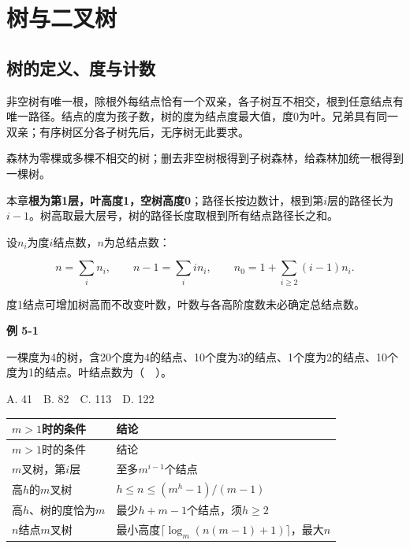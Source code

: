 \chapter{树与二叉树}\label{DS05}

\section{树的定义、度与计数}\label{DS05-tree}

非空树有唯一根，除根外每结点恰有一个双亲，各子树互不相交，根到任意结点有唯一路径。结点的度为孩子数，树的度为结点度最大值，度0为叶。兄弟具有同一双亲；有序树区分各子树先后，无序树无此要求。

森林为零棵或多棵不相交的树；删去非空树根得到子树森林，给森林加统一根得到一棵树。

本章\textbf{根为第1层，叶高度1，空树高度0}；路径长按边数计，根到第\(i\)层的路径长为\(i-1\)。树高取最大层号，树的路径长度取根到所有结点路径长之和。

设\(n_i\)为度\(i\)结点数，\(n\)为总结点数：

\[n=\sum_i n_i,\qquad n-1=\sum_i i n_i,\qquad n_0=1+\sum_{i\ge2}(i-1)n_i.\]

度1结点可增加树高而不改变叶数，叶数与各高阶度数未必确定总结点数。

\par\medskip{}\noindent\hypertarget{DS05-E01}{}\label{DS05-E01}\textbf{例 5-1}\par\nobreak\smallskip

一棵度为4的树，含20个度为4的结点、10个度为3的结点、1个度为2的结点、10个度为1的结点。叶结点数为（　）。

A. 41　B. 82　C. 113　D. 122

\par\smallskip
{\fontsize{9.3}{12}\selectfont\setlength{\tabcolsep}{2.5pt}\setlength{\LTleft}{0pt}\setlength{\LTright}{0pt}
\begin{longtable}{@{}>{\raggedright\arraybackslash}p{}>{\raggedright\arraybackslash}p{}@{}}
\toprule
\(m>1\)时的条件 & 结论 \\

\midrule\endfirsthead\toprule
\(m>1\)时的条件 & 结论 \\

\midrule\endhead\bottomrule\endfoot
\(m\)叉树，第\(i\)层 & 至多\(m^{i-1}\)个结点 \\

高\(h\)的\(m\)叉树 & \(h\le n\le(m^h-1)/(m-1)\) \\

高\(h\)、树的度恰为\(m\) & 最少\(h+m-1\)个结点，须\(h\ge2\) \\

\(n\)结点\(m\)叉树 & 最小高度\(\lceil\log_m(n(m-1)+1)\rceil\)，最大\(n\) \\

\end{longtable}}
\par\smallskip


